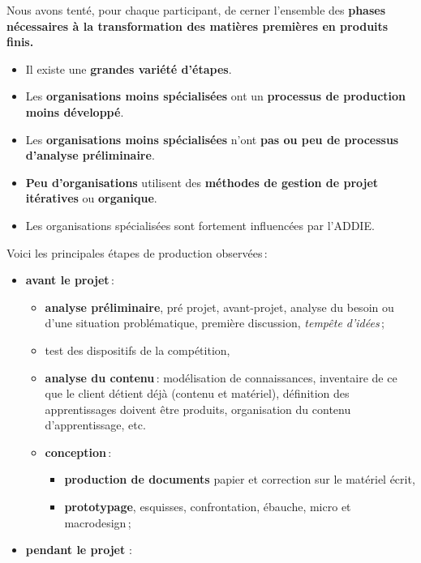 \begin{frame}[allowframebreaks]
                   			
                        			Nous avons tenté, pour chaque participant, de cerner l’ensemble des \textbf{phases nécessaires à la transformation des matières premières en produits finis.}
						\begin{itemize}
						\framebreak
						\item Il existe une \textbf{grandes variété d'étapes}.
						\item Les \textbf{organisations moins spécialisées} ont un \textbf{processus de production moins développé}.
						\item Les \textbf{organisations moins spécialisées} n'ont \textbf{pas ou peu de processus d'analyse préliminaire}.
						\item \textbf{Peu d'organisations} utilisent des \textbf{méthodes de gestion de projet itératives} ou \textbf{organique}.
						\item Les organisations spécialisées sont fortement influencées par l'ADDIE.
						\end{itemize}
						\framebreak
						Voici les principales étapes de production observées\,:	
						\begin{itemize}
						\item \textbf{avant le projet}\,: 
							\begin{itemize}
							\item \textbf{analyse préliminaire}, pré projet, avant-projet, analyse du besoin ou d'une situation problématique, première discussion, \textit{tempête d’idées}\,;
							\item test des dispositifs de la compétition, 
							\item \textbf{analyse du contenu}\,: modélisation de connaissances, inventaire de ce que le client détient déjà (contenu et matériel), définition des apprentissages doivent être produits, organisation du contenu d’apprentissage, etc.
							\framebreak
							\item \textbf{conception}\,:
								\begin{itemize}
								\item \textbf{production de documents} papier et  correction sur le matériel écrit,
								\item \textbf{prototypage}, esquisses, confrontation, ébauche, micro et macrodesign\,;
								\end{itemize}
							\end{itemize}
						\framebreak
						\item \textbf{pendant le projet }:
							\begin{itemize}

\end{itemize}
\end{itemize}
\end{frame}
